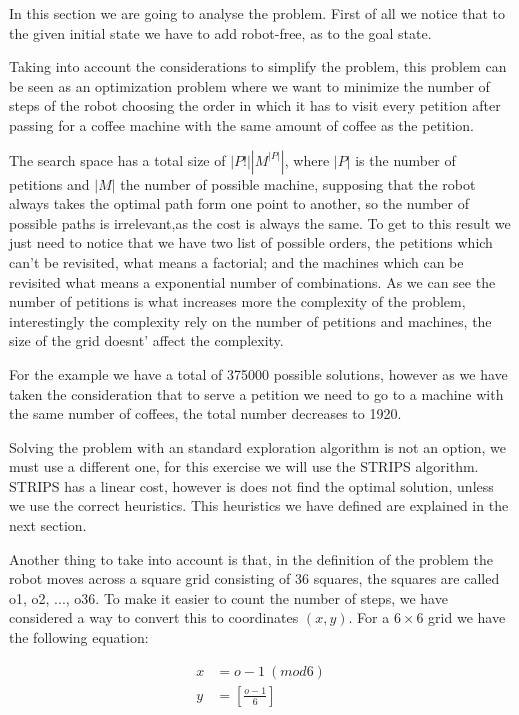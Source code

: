 \documentclass[12pt,a4paper,oneside]{article}
\numberwithin{equation}{section}
\numberwithin{equation}{section}
\theoremstyle{definition}
\begin{document}
In this section we are going to  analyse the problem. First of all we notice that to the given initial state we have to  add robot-free, as to the goal state.

Taking into account the considerations to simplify the problem, this problem can be seen as an optimization problem where we want to minimize the number of steps of the robot choosing the order in which it has to visit every petition after passing for a coffee machine with the same amount of coffee as the petition. 

The search space has a total size of $|P!||M^{|P|}|$, where $|P|$ is the number of petitions and $|M|$ the number of possible machine, supposing that the robot always takes the optimal path form one point to another, so the number of possible paths is irrelevant,as the cost is always the same. To get to this result we just need to notice that we have two list of possible orders, the petitions which can't be revisited, what means a factorial; and the machines which can be revisited what means a exponential number of combinations. As we can see the number of petitions is what increases more the complexity of the problem, interestingly the complexity rely on the number of petitions and machines, the size of the grid doesnt' affect the complexity.

For the example we have a total of 375000 possible solutions, however as we have taken the consideration that to serve a petition we need to go to a machine with the same number of coffees, the total number decreases to 1920.

Solving the problem with an standard exploration algorithm is not an option, we must use a different one, for this exercise we will use the STRIPS algorithm. STRIPS has a linear cost, however is does not find the optimal solution, unless we use the correct heuristics. This heuristics we have defined are explained in the next section.

Another thing to take into account is that, in the definition of the problem the robot moves across a square grid consisting of 36 squares, the squares are called o1, o2, ..., o36. To make it easier to count the number of steps, we have considered a way to convert this to coordinates $(x,y)$. For a $6 \times 6$ grid we have the following equation:

\begin{align}
	x & = o-1 \ (mod6) \\
	y & = [\frac{o-1}{6}] 
\end{align}
\end{document}
